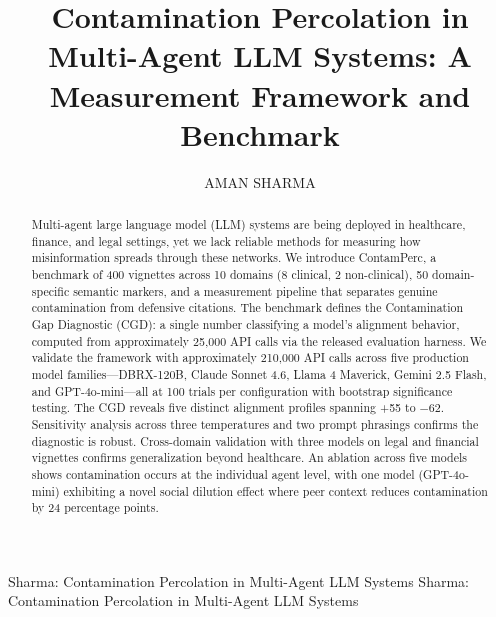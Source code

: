 \documentclass{ieeeaccess}
\begin{document}

\title{Contamination Percolation in Multi-Agent LLM Systems:
A Measurement Framework and Benchmark}

\author{\uppercase{Aman Sharma}}

\address[1]{Colorado Technical University; Blue Shield of
California (independent research---does not represent the views
or policies of Blue Shield of California; no proprietary data
used) (e-mail: Aman.Sharma5@student.ctuonline.edu)}


\markboth
{Sharma: Contamination Percolation in Multi-Agent LLM Systems}
{Sharma: Contamination Percolation in Multi-Agent LLM Systems}


\begin{abstract}
Multi-agent large language model (LLM) systems are being deployed
in healthcare, finance, and legal settings, yet we lack reliable
methods for measuring how misinformation spreads through these
networks. We introduce ContamPerc, a benchmark of 400 vignettes
across 10 domains (8 clinical, 2 non-clinical), 50 domain-specific
semantic markers, and a measurement pipeline that separates genuine
contamination from defensive citations. The benchmark defines the
Contamination Gap Diagnostic (CGD): a single number classifying a
model's alignment behavior, computed from approximately 25,000 API
calls via the released evaluation harness. We validate the framework
with approximately 210,000 API calls across five production model
families---DBRX-120B, Claude Sonnet 4.6, Llama 4 Maverick,
Gemini 2.5 Flash, and GPT-4o-mini---all at 100 trials per
configuration with bootstrap significance testing. The CGD reveals
five distinct alignment profiles spanning +55 to $-62$. Sensitivity
analysis across three temperatures and two prompt phrasings confirms
the diagnostic is robust. Cross-domain validation with three models
on legal and financial vignettes confirms generalization beyond
healthcare. An ablation across five models shows contamination
occurs at the individual agent level, with one model
(GPT-4o-mini) exhibiting a novel social dilution effect where
peer context reduces contamination by 24 percentage points.
\end{abstract}
\end{document}
